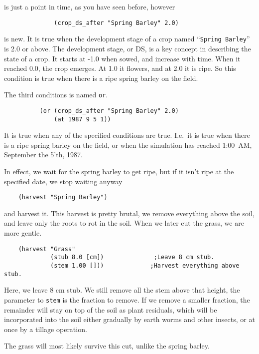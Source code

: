 \documentclass[a4paper,11pt]{article}
\begin{document}
is just a point in time, as you have seen before, however

\begin{verbatim}
              (crop_ds_after "Spring Barley" 2.0)
\end{verbatim}

is new.  It is true when the development stage of a crop named
``\texttt{Spring Barley}'' is 2.0 or above.  The development stage, or
DS, is a key concept in describing the state of a crop.  It starts at
-1.0 when sowed, and increase with time.  When it reached 0.0, the
crop emerges.  At 1.0 it flowers, and at 2.0 it is ripe.   So this
condition is true when there is a ripe spring barley on the field.

The third conditions is named \texttt{or}.

\begin{verbatim}
          (or (crop_ds_after "Spring Barley" 2.0)
              (at 1987 9 5 1))
\end{verbatim}

It is true when any of the specified conditions are true.  I.e.\ it is
true when there is a ripe spring barley on the field, or when the
simulation has reached 1:00~AM, September the 5'th, 1987.

In effect, we wait for the spring barley to get ripe, but if it isn't
ripe at the specified date, we stop waiting anyway

\begin{verbatim}
    (harvest "Spring Barley")
\end{verbatim}

and harvest it.  This harvest is pretty brutal, we remove everything
above the soil, and leave only the roots to rot in the soil.  When we
later cut the grass, we are more gentle.

\begin{verbatim}
    (harvest "Grass"
             (stub 8.0 [cm])              ;Leave 8 cm stub.
             (stem 1.00 []))             ;Harvest everything above stub.
\end{verbatim}

Here, we leave 8 cm stub.  We still remove all the stem above that
height, the parameter to \texttt{stem} is the fraction to remove.  If
we remove a smaller fraction, the remainder will stay on top of the
soil as plant residuals, which will be incorporated into the soil
either gradually by earth worms and other insects, or at once by a
tillage operation.

The grass will most likely survive this cut, unlike the spring barley.
\end{document}
